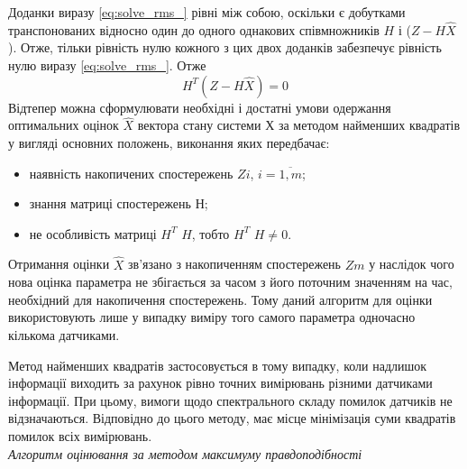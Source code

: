 Доданки виразу \eqref{eq:solve_rms_} рівні між собою, оскільки є добутками транспонованих 
відносно один до одного однакових співмножників $H$ і ($Z- H\hat{X }$). 
Отже, тільки рівність  нулю кожного з цих двох доданків забезпечує 
рівність нулю виразу \eqref{eq:solve_rms_}.
Отже                   
\[ H^{T}(Z-H \hat{X}) = 0 \]
Відтепер можна сформулювати необхідні і достатні умови одержання оптимальних оцінок $\hat{X}$
вектора стану системи $Х$ за методом найменших квадратів  
у вигляді основних положень, виконання яких передбачає:
\begin{itemize}
\item наявність накопичених спостережень $Zi$, $i=\overline{1,m}$;
\item знання матриці спостережень $Н$;
\item не особливість матриці $H^{T}$ $H$, тобто $H^{T}$ $H \ne 0$.
\end{itemize}

Отримання оцінки  $\hat{X}$  зв'язано з накопиченням спостережень  $Zm$  
у наслідок чого нова оцінка параметра не збігається за часом з його поточним значенням 
на час, необхідний для накопичення спостережень. Тому даний алгоритм для оцінки використовують 
лише у випадку виміру того самого параметра одночасно кількома датчиками.

Метод найменших квадратів застосовується в тому випадку, коли надлишок інформації 
виходить за рахунок рівно точних вимірювань різними датчиками інформації. При цьому, 
вимоги щодо спектрального складу помилок датчиків не відзначаються. Відповідно до 
цього методу, має місце мінімізація суми квадратів помилок всіх вимірювань. \\

\textit{Алгоритм оцінювання за методом максимуму правдоподібності}\\

